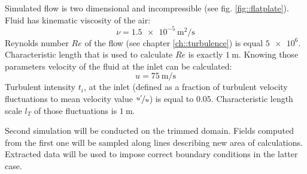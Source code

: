         
        Simulated flow is two dimensional and incompressible (see fig. \ref{fig::flatplate}). 
        Fluid has kinematic viscosity of the air: 
        \begin{equation*}
            \nu =  \SI{1.5e-5}{\metre\squared\per\second}
        \end{equation*}
        Reynolds number $Re$ of the flow (see chapter \ref{ch::turbulence}) is equal $\num{5e6}$. Characteristic length that is used to calculate $Re$ is exactly $\SI{1}{\meter}$. 
        Knowing those parameters velocity of the fluid at the inlet can be calculated:
        \begin{equation*}
            u = \SI{75}{\metre\per\second}
        \end{equation*}
        Turbulent intensity $t_i$, at the inlet (defined as a fraction of turbulent velocity fluctuations to mean velocity value $\nicefrac{u'}{u}$) is equal to $\num{0,05}$.
        Characteristic length scale $l_T$ of those fluctuations is $\SI{1}{\meter}$.

        Second simulation will be conducted on the trimmed domain. Fields computed from the first one will be sampled along lines describing new area of calculations. Extracted data will be used to impose correct boundary conditions in the latter case. 

       
        

        